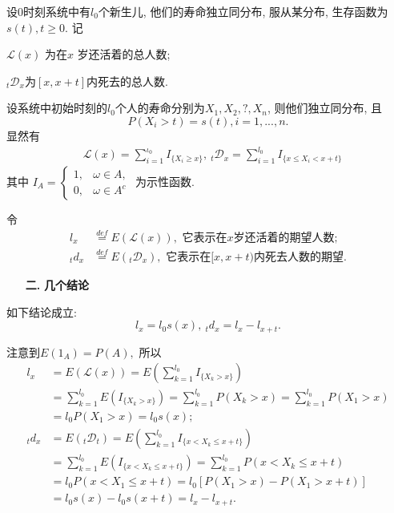 \documentclass[a4paper,10pt]{ctexbook}
\newcommand{\hei}{\CJKfamily{hei}}      %
\def\z{\left}
\def\y{\right}
\begin{document}
设0时刻系统中有$l_0$个新生儿, 他们的寿命独立同分布, 服从某分布, 生存函数为$s(t),t\ge 0.$  记

$\mathscr{L}(x)$ 为在$x$ 岁还活着的总人数;

$_t \mathscr{D}_x$为$[x,x+t]$内死去的总人数.

设系统中初始时刻的$l_0$个人的寿命分别为$X_1,X_2,?,X_n$, 则他们独立同分布, 且
$$P(X_i>t)=s(t), i=1,...,n.$$
显然有
\begin{align*}
     & \mathscr{L}(x)=\sum_{i=1}^{\iota_{\mathrm{0}}}I_{\{X_{i}\geqslant x\}},\ {}_t\mathscr{D}_x=\sum_{i=1}^{l_0}I_{\{ x\leqslant X_i<x+t\}}
\end{align*}
其中
$
    I_{A}=\left\{\begin{array}{ll}1,&\omega\in A,\\0,&\omega\in A^c\end{array}\right.
$ 为示性函数.

令 \begin{align*}
    l_x     & \overset{def}{=}E\z(\mathscr L(x)\y), \text{ 它表示在}x\text{岁还活着的期望人数};         \\
    {}_td_x & \overset{def}{=}E\z({}_t\mathscr D_x \y),\text{ 它表示在}[x,x+t)\text{内死去人数的期望}.
\end{align*}



\begin{itemize}
    \item[{\bf\hei 二.}]{\bf\hei 几个结论}
\end{itemize}

\begin{proposition} 如下结论成立:
    $$l_x=l_0s(x),\ {}_td_x=l_x-l_{x+t}.$$
\end{proposition}
\proof 注意到$E(1_A)=P(A),$ 所以
\begin{align*}
    l_x     & =E(\mathscr{L}(x))=E(\sum_{k=1}^{l_0}I_{\{X_k>x\}})                        \\
            & =\sum_{k=1}^{l_0}E(I_{\{X_k>x\}})
    =\sum_{k=1}^{l_0}P(X_k>x)
    =\sum_{k=1}^{l_0}P(X_1>x)                                                            \\
            & =l_0P(X_1>x)=l_0s(x);                                                      \\
    {}_td_x & =E(_t\mathscr{D}_t)=E(\sum_{k=1}^{l_0}I_{\{x<X_k\leq x+t\}})               \\
            & =\sum_{k=1}^{l_0}E(I_{\{x<X_k\leq x+t\}})=\sum_{k=1}^{l_0}P(x<X_k\leq x+t) \\
            & =l_0P(x<X_1\leq x+t)=l_0[P(X_1>x)-P(X_1>x+t)]                              \\
            & =l_0s(x)-l_0s(x+t)
    =l_x-l_{x+t}.
\end{align*}
\end{document}
